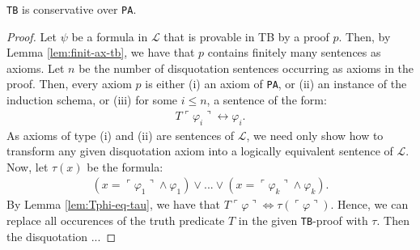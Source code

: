 \begin{theorem}
    \label{thm:tb-cons}
    \texttt{TB} is conservative over \texttt{PA}.
\end{theorem}

\begin{proof}  
Let $\psi$ be a formula in $\mathcal{L}$ that is provable in TB by a proof $p$. Then, by Lemma \ref{lem:finit-ax-tb}, we have that $p$ contains finitely many sentences as axioms. Let $n$ be the number of disquotation sentences occurring as axioms in the proof. Then, every axiom $p$ is either (i) an axiom of \texttt{PA}, or (ii) an instance of the induction schema, or (iii) for some $i \leq n$, a sentence of the form: 
\begin{align*}
    T\ulcorner \varphi_i \urcorner \leftrightarrow \varphi_i.
\end{align*}
As axioms of type (i) and (ii) are sentences of $\mathcal{L}$, we need only show how to transform any given disquotation axiom into a logically equivalent sentence of $\mathcal{L}$. Now, let $\tau(x)$ be the formula: 
\begin{align*}
    (x = \ulcorner \varphi_1 \urcorner \land \varphi_1) \lor ... \lor (x = \ulcorner \varphi_k \urcorner \land \varphi_k).
\end{align*}
By Lemma \ref{lem:Tphi-eq-tau}, we have that $T\ulcorner \varphi \urcorner \iff \tau(\ulcorner \varphi \urcorner)$. Hence, we can replace all occurences of the truth predicate $T$ in the given \texttt{TB}-proof with $\tau$. Then the disquotation ...
\end{proof}

